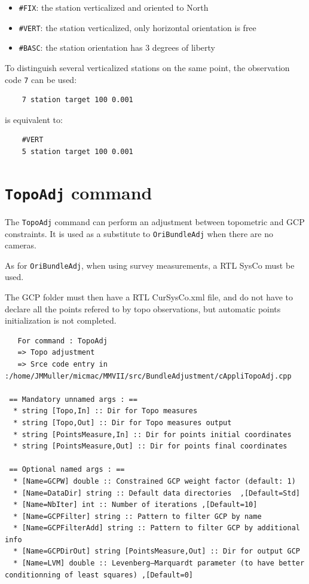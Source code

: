 \begin{itemize}
    \item \texttt{\#FIX}: the station verticalized and oriented to North
    \item \texttt{\#VERT}: the station verticalized, only horizontal orientation is free
    \item \texttt{\#BASC}: the station orientation has 3 degrees of liberty 
\end{itemize}

To distinguish several verticalized stations on the same point, the observation code {\tt 7} can be used:

\begin{verbatim}
    7 station target 100 0.001
\end{verbatim}

is equivalent to:

\begin{verbatim}
    #VERT
    5 station target 100 0.001
\end{verbatim}



\section{{\tt TopoAdj} command}

The {\tt TopoAdj} command can perform an adjustment between topometric and GCP constraints.
It is used as a substitute to {\tt OriBundleAdj} when there are no cameras.

As for {\tt OriBundleAdj}, when using survey measurements, a RTL SysCo must be used.

The GCP folder must then have a RTL CurSysCo.xml file, and do not have to declare all the points
refered to by topo observations, but automatic points initialization is not completed.

\begin{verbatim}
   For command : TopoAdj 
   => Topo adjustment
   => Srce code entry in :/home/JMMuller/micmac/MMVII/src/BundleAdjustment/cAppliTopoAdj.cpp

 == Mandatory unnamed args : ==
  * string [Topo,In] :: Dir for Topo measures
  * string [Topo,Out] :: Dir for Topo measures output
  * string [PointsMeasure,In] :: Dir for points initial coordinates
  * string [PointsMeasure,Out] :: Dir for points final coordinates

 == Optional named args : ==
  * [Name=GCPW] double :: Constrained GCP weight factor (default: 1)
  * [Name=DataDir] string :: Default data directories  ,[Default=Std]
  * [Name=NbIter] int :: Number of iterations ,[Default=10]
  * [Name=GCPFilter] string :: Pattern to filter GCP by name
  * [Name=GCPFilterAdd] string :: Pattern to filter GCP by additional info
  * [Name=GCPDirOut] string [PointsMeasure,Out] :: Dir for output GCP
  * [Name=LVM] double :: Levenberg–Marquardt parameter (to have better conditionning of least squares) ,[Default=0]

\end{verbatim}



